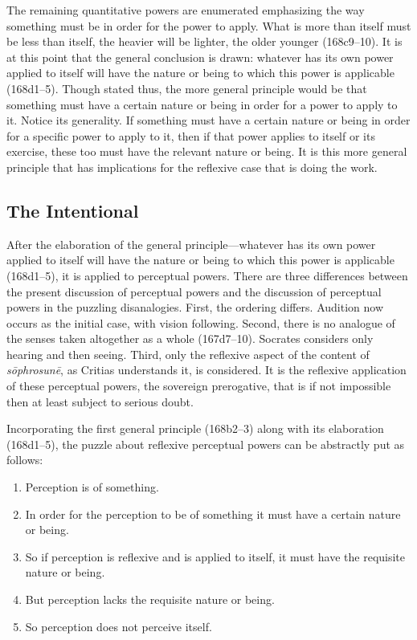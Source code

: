 The remaining quantitative powers are enumerated emphasizing the way something must be in order for the power to apply. What is more than itself must be less than itself, the heavier will be lighter, the older younger (168c9–10). It is at this point that the general conclusion is drawn: whatever has its own power applied to itself will have the nature or being to which this power is applicable (168d1–5). Though stated thus, the more general principle would be that something must have a certain nature or being in order for a power to apply to it. Notice its generality. If something must have a certain nature or being in order for a specific power to apply to it, then if that power applies to itself or its exercise, these too must have the relevant nature or being. It is this more general principle that has implications for the reflexive case that is doing the work.


\subsection{The Intentional} %
\label{sub:the_intentional}

After the elaboration of the general principle—whatever has its own power applied to itself will have the nature or being to which this power is applicable (168d1–5), it is applied to perceptual powers. There are three differences between the present discussion of perceptual powers and the discussion of perceptual powers in the puzzling disanalogies. First, the ordering differs. Audition now occurs as the initial case, with vision following. Second, there is no analogue of the senses taken altogether as a whole (167d7–10). Socrates considers only hearing and then seeing. Third, only the reflexive aspect of the content of \emph{sōphrosunē}, as Critias understands it, is considered. It is the reflexive application of these perceptual powers, the sovereign prerogative, that is if not impossible then at least subject to serious doubt.

Incorporating the first general principle (168b2–3) along with its elaboration (168d1–5), the puzzle about reflexive perceptual powers can be abstractly put as follows:
\begin{enumerate}[(1)]
	\item Perception is of something.
	\item In order for the perception to be of something it must have a certain nature or being.
	\item So if perception is reflexive and is applied to itself, it must have the requisite nature or being.
	\item But perception lacks the requisite nature or being.
	\item So perception does not perceive itself.
\end{enumerate} 

